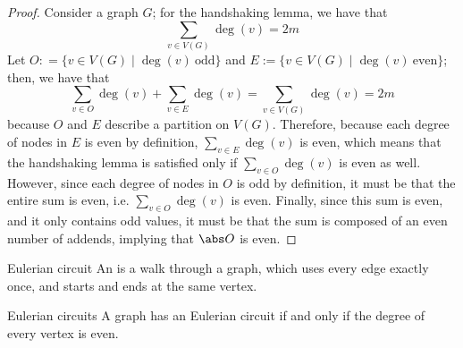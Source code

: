 \documentclass[a4paper, 12pt]{report}
\begin{document}
    \begin{proof}
        Consider a graph $G$; for the handshaking lemma, we have that $$\sum_{v \in V(G)}{\deg(v)} = 2 m$$ Let $O: = \{v \in V(G) \mid \deg(v) \ \mathrm{odd}\}$ and $E := \{v \in V(G) \mid \deg(v) \ \mathrm{even}\}$; then, we have that $$\sum_{v \in O}{\deg(v)} + \sum_{v \in E}{\deg(v)} = \sum_{v \in V(G)} {\deg(v)} = 2m$$ because $O$ and $E$ describe a partition on $V(G)$. Therefore, because each degree of nodes in $E$ is even by definition, $\sum_{v \in E}{\deg(v)}$ is even, which means that the handshaking lemma is satisfied only if $\sum_{v \in O}{\deg(v)}$ is even as well. However, since each degree of nodes in $O$ is odd by definition, it must be that the entire sum is even, i.e. $\sum_{v \in O}{\deg(v)}$ is even. Finally, since this sum is even, and it only contains odd values, it must be that the sum is composed of an even number of addends, implying that $\abs O$ is even.
    \end{proof}

    \begin{frameddefn}{Eulerian circuit}
        An  is a walk through a graph, which uses every edge exactly once, and starts and ends at the same vertex.
    \end{frameddefn}

    \begin{framedthm}[label={eul circ}]{Eulerian circuits}
        A graph has an Eulerian circuit if and only if the degree of every vertex is even.
    \end{framedthm}
\end{document}
